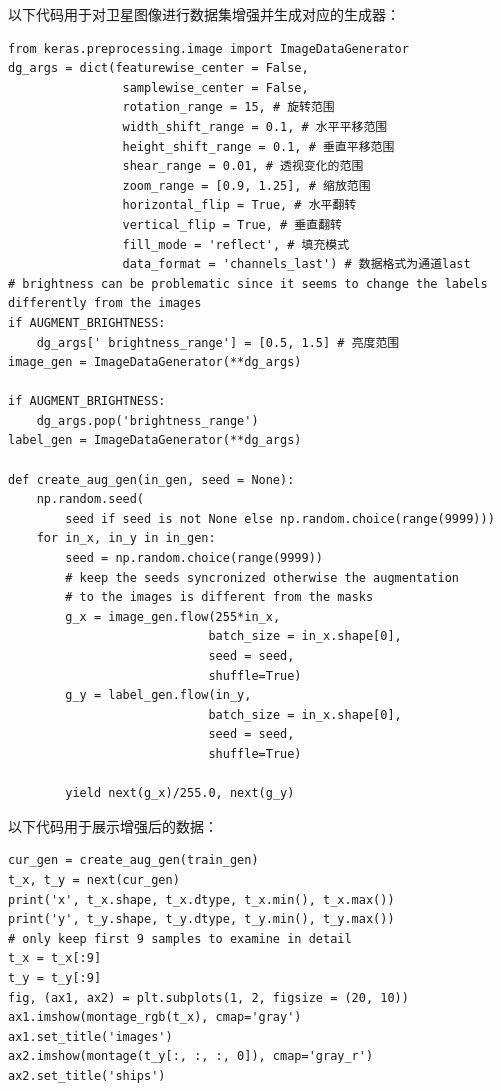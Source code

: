 以下代码用于对卫星图像进行数据集增强并生成对应的生成器：

\begin{lstlisting}
from keras.preprocessing.image import ImageDataGenerator
dg_args = dict(featurewise_center = False, 
                samplewise_center = False,
                rotation_range = 15, # 旋转范围
                width_shift_range = 0.1, # 水平平移范围
                height_shift_range = 0.1, # 垂直平移范围
                shear_range = 0.01, # 透视变化的范围
                zoom_range = [0.9, 1.25], # 缩放范围
                horizontal_flip = True, # 水平翻转
                vertical_flip = True, # 垂直翻转
                fill_mode = 'reflect', # 填充模式
                data_format = 'channels_last') # 数据格式为通道last
# brightness can be problematic since it seems to change the labels differently from the images 
if AUGMENT_BRIGHTNESS:
    dg_args[' brightness_range'] = [0.5, 1.5] # 亮度范围
image_gen = ImageDataGenerator(**dg_args)

if AUGMENT_BRIGHTNESS:
    dg_args.pop('brightness_range')
label_gen = ImageDataGenerator(**dg_args)

def create_aug_gen(in_gen, seed = None):
    np.random.seed(
        seed if seed is not None else np.random.choice(range(9999)))
    for in_x, in_y in in_gen:
        seed = np.random.choice(range(9999))
        # keep the seeds syncronized otherwise the augmentation
        # to the images is different from the masks
        g_x = image_gen.flow(255*in_x, 
                            batch_size = in_x.shape[0], 
                            seed = seed, 
                            shuffle=True)
        g_y = label_gen.flow(in_y, 
                            batch_size = in_x.shape[0], 
                            seed = seed, 
                            shuffle=True)

        yield next(g_x)/255.0, next(g_y)
\end{lstlisting}

以下代码用于展示增强后的数据：

\begin{lstlisting}
cur_gen = create_aug_gen(train_gen)
t_x, t_y = next(cur_gen)
print('x', t_x.shape, t_x.dtype, t_x.min(), t_x.max())
print('y', t_y.shape, t_y.dtype, t_y.min(), t_y.max())
# only keep first 9 samples to examine in detail
t_x = t_x[:9]
t_y = t_y[:9]
fig, (ax1, ax2) = plt.subplots(1, 2, figsize = (20, 10))
ax1.imshow(montage_rgb(t_x), cmap='gray')
ax1.set_title('images')
ax2.imshow(montage(t_y[:, :, :, 0]), cmap='gray_r')
ax2.set_title('ships')
\end{lstlisting}

